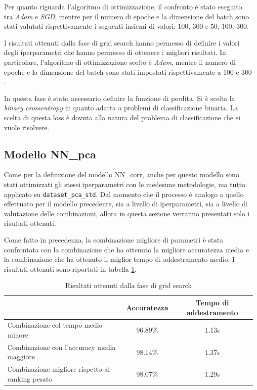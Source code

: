 Per quanto riguarda l'algoritmo di ottimizzazione, il confronto è stato eseguito
tra \textit{Adam} e \textit{SGD}, mentre per il numero di epoche e la dimensione
del batch sono stati valutati rispettivamente i seguenti insiemi di valori: $100$, $300$ e $50$,
$100$, $300$.

I risultati ottenuti dalla fase di grid search hanno permesso di definire i valori
degli iperparametri che hanno permesso di ottenere i migliori risultati. In
particolare, l'algoritmo di ottimizzazione scelto è \textit{Adam}, mentre il
numero di epoche e la dimensione del batch sono stati impostati rispettivamente
a $100$ e $300$.

In questa fase è stato necessario definire la funzione di perdita. Si è scelta
la \textit{binary crossentropy} in quanto adatta a problemi di classificazione
binaria. La scelta di questa loss è dovuta alla natura del problema di
classificazione che si vuole risolvere.

\subsection{Modello NN\_pca}

Come per la definizione del modello NN\_corr, anche per questo modello sono stati
ottimizzati gli stessi iperparametri con le medesime metodologie, ma tutto applicato
su \texttt{dataset\_pca\_std}. Dal momento che il processo è analogo a quello
effettuato per il modello precedente, sia a livello di iperparametri, sia a livello
di valutazione delle combinazioni, allora in questa sezione verranno presentati
solo i risultati ottenuti.

Come fatto in precedenza, la combinazione migliore di parametri è stata confrontata
con la combinazione che ha ottenuto la migliore accuratezza media e la combinazione
che ha ottenuto il miglior tempo di addestramento medio. I risultati ottenuti sono
riportati in tabella \ref{tab:ris-grid-search-pca}.

\begin{table}[ht]
    \centering
    \begin{tabular}{@{}lcc@{}}
        \toprule
        \rowcolor[HTML]{EFEFEF}
        \multicolumn{1}{c}{\cellcolor[HTML]{EFEFEF}\textbf{Combinazione di parametri}} & \textbf{Accuratezza} & \textbf{Tempo di addestramento} \\ \midrule
        Combinazione col tempo medio minore                                            & 96.89\%              & 1.13s                           \\
        Combinazione con l'accuracy media maggiore                                     & 98.14\%              & 1.37s                          \\
        Combinazione migliore rispetto al ranking pesato                               & 98.07\%              & 1.29s                           \\ \bottomrule
    \end{tabular}
    \caption{Risultati ottenuti dalla fase di grid search}
    \label{tab:ris-grid-search-pca}
\end{table}

